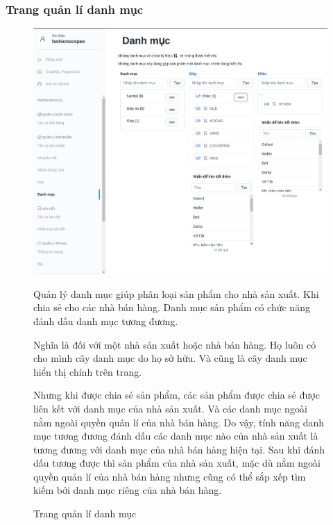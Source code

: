\subsubsection{Trang quản lí danh mục}
\FloatBarrier
\begin{figure}[!htbp]\fontsize{13px}{13px}\selectfont
\centering
		\includegraphics[width=\textwidth]{./results/categories}
		\caption{Trang quản lí danh mục}
\justifying
Quản lý danh mục giúp phân loại sản phẩm cho nhà sản xuất. Khi chia sẻ cho các nhà bán hàng. Danh mục sản phẩm có chức năng đánh dấu danh mục tương đương.

Nghĩa là đối với một nhà sản xuất hoặc nhà bán hàng. Họ luôn có cho mình cây danh mục do họ sở hữu. Và cũng là cây danh mục hiển thị chính trên trang.

Nhưng khi được chia sẻ sản phẩm, các sản phẩm được chia sẻ được liên kết với danh mục của nhà sản xuất. Và các danh mục ngoài nằm ngoài quyền quản lí của nhà bán hàng. Do vậy, tính năng danh mục tương đương đánh dấu các danh mục nào của nhà sản xuất là tương đương với danh mục của nhà bán hàng hiện tại. Sau khi đánh dấu tương được thì sản phẩm của nhà sản xuất, mặc dù nằm ngoài quyền quản lí của nhà bán hàng nhưng cũng có thể sắp xếp tìm kiếm bởi danh mục riêng của nhà bán hàng.
\end{figure}
\clearpage
